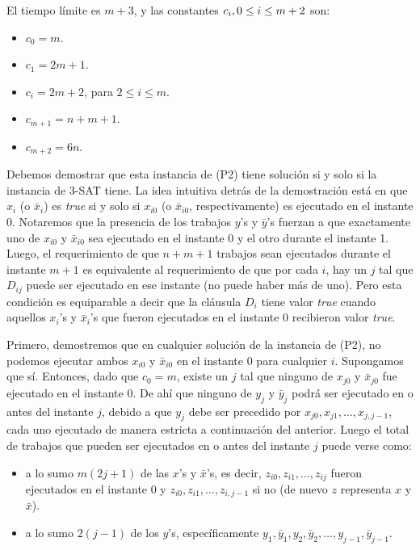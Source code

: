 \documentclass[14pt]{extarticle}
\begin{document}
El tiempo límite es $m + 3$, y las constantes $c_i, \space 0 \leq i \leq m + 2$ son:

\begin{itemize}
    \item $c_0 = m$.
    \item $c_1 = 2m + 1$.
    \item $c_i = 2m + 2$, para $2 \leq i \leq m$.
    \item $c_{m+1} = n + m + 1$.
    \item $c_{m+2} = 6n$.
\end{itemize}

Debemos demostrar que esta instancia de (P2) tiene solución si y solo si la instancia de 3-SAT tiene. La idea intuitiva detrás de la demostración está en que $x_i$ (o $\bar x_i$) es \textit{true} si y solo si $x_{i0}$ (o $\bar x_{i0}$, respectivamente) es ejecutado en el instante 0. Notaremos que la presencia de los trabajos $y$'s y $\bar y$'s fuerzan a que exactamente uno de $x_{i0}$ y $\bar x_{i0}$ sea ejecutado en el instante 0 y el otro durante el instante 1. Luego, el requerimiento de que $n + m + 1$ trabajos sean ejecutados durante el instante $m + 1$ es equivalente al requerimiento de que por cada $i$, hay un $j$ tal que $D_{ij}$ puede ser ejecutado en ese instante (no puede haber más de uno). Pero esta condición es equiparable a decir que la cláusula $D_i$ tiene valor \textit{true} cuando aquellos $x_i$'s y $\bar x_i$'s que fueron ejecutados en el instante 0 recibieron valor \textit{true}.

Primero, demostremos que en cualquier solución de la instancia de (P2), no podemos ejecutar ambos $x_{i0}$ y $\bar x_{i0}$ en el instante 0 para cualquier $i$. Supongamos que sí. Entonces, dado que $c_0 = m$, existe un $j$ tal que ninguno de $x_{j0}$ y $\bar x_{j0}$ fue ejecutado en el instante 0. De ahí que ninguno de $y_j$ y $\bar y_j$ podrá ser ejecutado en o antes del instante $j$, debido a que $y_j$ debe ser precedido por $x_{j0}, x_{j1}, \ldots, x_{j, j-1}$, cada uno ejecutado de manera estricta a continuación del anterior. Luego el total de trabajos que pueden ser ejecutados en o antes del instante $j$ puede verse como:

\begin{itemize}
    \item a lo sumo $m(2j + 1)$ de las $x$'s y $\bar x$'s, es decir, $z_{i0}, z_{i1}, \ldots, z_{ij}$ fueron ejecutados en el instante 0 y $z_{i0}, z_{i1}, \ldots, z_{i, j-1}$ si no (de nuevo $z$ representa $x$ y $\bar x$).
    \item a lo sumo $2(j - 1)$ de los $y$'s, específicamente $y_1, \bar y_1, y_2, \bar y_2, \ldots, y_{j - 1}, \bar y_{j - 1}$.
\end{itemize}
\end{document}
